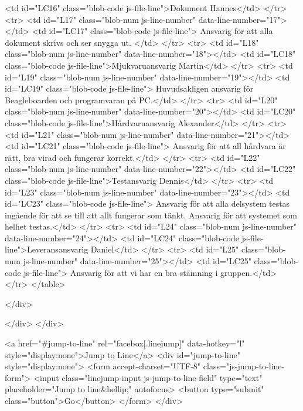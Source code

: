         <td id="LC16" class="blob-code js-file-line">Dokument	Hannes</td>
      </tr>
      <tr>
        <td id="L17" class="blob-num js-line-number" data-line-number="17"></td>
        <td id="LC17" class="blob-code js-file-line">	Ansvarig för att alla dokument skrivs och ser snygga ut. </td>
      </tr>
      <tr>
        <td id="L18" class="blob-num js-line-number" data-line-number="18"></td>
        <td id="LC18" class="blob-code js-file-line">Mjukvaruansvarig	Martin</td>
      </tr>
      <tr>
        <td id="L19" class="blob-num js-line-number" data-line-number="19"></td>
        <td id="LC19" class="blob-code js-file-line">	Huvudsakligen ansvarig för Beagleboarden och programvaran på PC.</td>
      </tr>
      <tr>
        <td id="L20" class="blob-num js-line-number" data-line-number="20"></td>
        <td id="LC20" class="blob-code js-file-line">Hårdvaruansvarig	Alexander</td>
      </tr>
      <tr>
        <td id="L21" class="blob-num js-line-number" data-line-number="21"></td>
        <td id="LC21" class="blob-code js-file-line">	Ansvarig för att all hårdvara är rätt, bra virad och fungerar korrekt.</td>
      </tr>
      <tr>
        <td id="L22" class="blob-num js-line-number" data-line-number="22"></td>
        <td id="LC22" class="blob-code js-file-line">Testansvarig	Dennis</td>
      </tr>
      <tr>
        <td id="L23" class="blob-num js-line-number" data-line-number="23"></td>
        <td id="LC23" class="blob-code js-file-line">	Ansvarig för att alla delsystem testas ingående för att se till att allt fungerar som tänkt. Ansvarig för att systemet som helhet testas.</td>
      </tr>
      <tr>
        <td id="L24" class="blob-num js-line-number" data-line-number="24"></td>
        <td id="LC24" class="blob-code js-file-line">Leveransansvarig	Daniel</td>
      </tr>
      <tr>
        <td id="L25" class="blob-num js-line-number" data-line-number="25"></td>
        <td id="LC25" class="blob-code js-file-line">	Ansvarig för att vi har en bra stämning i gruppen.</td>
      </tr>
</table>

  </div>

  </div>
</div>

<a href="#jump-to-line" rel="facebox[.linejump]" data-hotkey="l" style="display:none">Jump to Line</a>
<div id="jump-to-line" style="display:none">
  <form accept-charset="UTF-8" class="js-jump-to-line-form">
    <input class="linejump-input js-jump-to-line-field" type="text" placeholder="Jump to line&hellip;" autofocus>
    <button type="submit" class="button">Go</button>
  </form>
</div>

